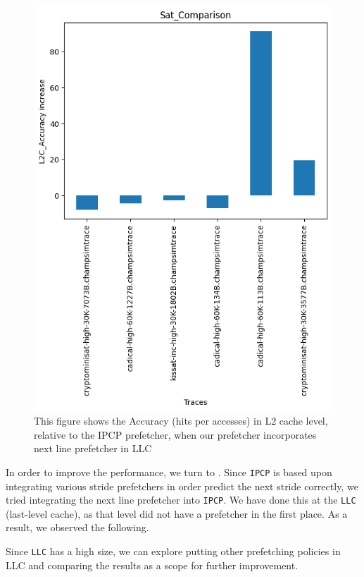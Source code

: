 \documentclass[conference]{IEEEtran}
\begin{document}
\begin{figure}
\includegraphics[scale=0.5]{Images/sat_l2c.png}
\caption{This figure shows the Accuracy (hits per accesses) in L2 cache level, relative to the IPCP prefetcher, when our prefetcher incorporates next line prefetcher in LLC}
\label{sat_l2c}
\end{figure}

In order to improve the performance, we turn to \cite{b3}. Since \verb|IPCP| is based upon integrating various stride prefetchers in order predict the next stride correctly, we tried integrating the next line prefetcher into \verb|IPCP|. We have done this at the \verb|LLC| (last-level cache), as that level did not have a prefetcher in the first place. As a result, we observed the following. %


Since \verb|LLC| has a high size, we can explore putting other prefetching policies in LLC and comparing the results as a scope for further improvement.
\end{document}
